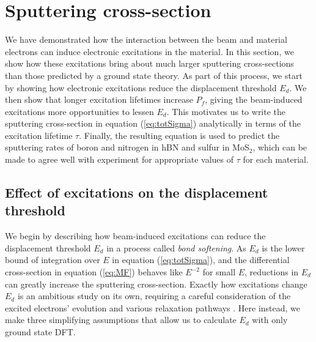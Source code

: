 \documentclass{article}
\begin{document}
\section{Sputtering cross-section}
\label{sec:sputtering}

We have demonstrated how the interaction between the beam and material
electrons can induce electronic excitations in the material.
In this section, we show how these excitations bring about much larger
sputtering cross-sections than those predicted by a ground state theory.
As part of this process, we start by showing how electronic excitations reduce
the displacement threshold $E_d$.
We then show that longer excitation lifetimes increase $P_f$, giving the
beam-induced excitations more opportunities to lessen $E_d$.
This motivates us to write the sputtering cross-section in equation
(\ref{eq:totSigma}) analytically in terms of the excitation lifetime $\tau$.
Finally, the resulting equation is used to predict the sputtering rates of
boron and nitrogen in hBN and sulfur in MoS$_2$, which can be made to agree
well with experiment for appropriate values of $\tau$ for each material.

\subsection{Effect of excitations on the displacement threshold}
\label{sec:assumptions}

We begin by describing how beam-induced excitations can reduce the
displacement threshold $E_d$ in a process called \textit{bond softening}.
As $E_d$ is the lower bound of integration over $E$ in equation
(\ref{eq:totSigma}), and the differential cross-section in equation
(\ref{eq:MF}) behaves like $E^{-2}$ for small $E$, reductions in $E_d$ can
greatly increase the sputtering cross-section.
Exactly how excitations change $E_d$ is an ambitious study on its own,
requiring a careful consideration of the excited electrons' evolution and
various relaxation pathways \cite{Lingerfelt2019a}.
Here instead, we make three simplifying assumptions that allow us to calculate
$E_d$ with only ground state DFT.
\end{document}
